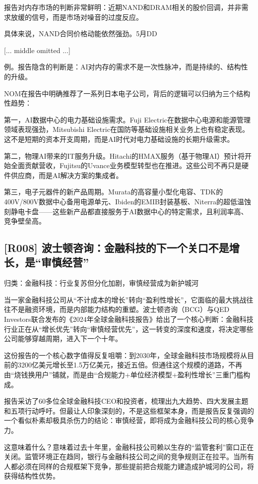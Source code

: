 \documentclass[11pt]{ctexart}
\begin{document}
报告对内存市场的判断非常鲜明：近期NAND和DRAM相关的股价回调，并非需求放缓的信号，而是市场对噪音的过度反应。

具体来说，NAND合同价格动能依然强劲。5月DD

[... middle omitted ...]

例。报告隐含的判断是：AI对内存的需求不是一次性脉冲，而是持续的、结构性的升级。

NOM在报告中明确推荐了一系列日本电子公司，背后的逻辑可以归纳为三个结构性趋势：

第一，AI数据中心的电力基础设施需求。Fuji Electric在数据中心电源和能源管理领域表现强劲，Mitsubishi Electric在国防等基础设施相关业务上也有稳定表现。这不是短期的资本开支周期，而是AI时代对电力基础设施的长期升级需求。

第二，物理AI带来的IT服务升级。Hitachi的HMAX服务（基于物理AI）预计将开始全面贡献营收，Fujitsu的Uvance业务模型转型也在推进。这些公司不再只是硬件供应商，而是AI解决方案的集成者。

第三，电子元器件的新产品周期。Murata的高容量小型化电容、TDK的400V/800V数据中心备用电源单元、Ibiden的EMIB封装基板、Niterra的超低温蚀刻静电卡盘——这些新产品都直接服务于AI数据中心的特定需求，且利润率高、竞争壁垒高。

\subsection{[R008] 波士顿咨询：金融科技的下一个关口不是增长，是“审慎经营”}
{\small\color{refgray}归类：金融科技：行业复苏但分化加剧，审慎经营成为新护城河}

当一家金融科技公司从“不计成本的增长”转向“盈利性增长”，它面临的最大挑战往往不是融资环境，而是内部能力结构的重塑。波士顿咨询（BCG）与QED Investors联合发布的《2024年全球金融科技报告》给出了一个核心判断：金融科技行业正在从“增长优先”转向“审慎经营优先”，这一转变的深度和速度，将决定哪些公司能够穿越周期，进入下一个十年。

这份报告的一个核心数字值得反复咀嚼：到2030年，全球金融科技市场规模将从目前的3200亿美元增长至1.5万亿美元，接近五倍。但通往这个规模的道路，不再由“烧钱换用户”铺就，而是由“合规能力+单位经济模型+盈利性增长”三重门槛构成。

报告采访了60多位全球金融科技CEO和投资者，梳理出九大趋势、四大发展主题和五项行动呼吁。但最让人印象深刻的，不是这些框架本身，而是报告反复强调的一个看似朴素却极具杀伤力的结论：审慎经营，即将成为金融科技公司的核心竞争力。

这意味着什么？意味着过去十年里，金融科技公司赖以生存的“监管套利”窗口正在关闭。监管环境正在趋同，银行与金融科技公司之间的竞争规则正在拉平。当所有人都必须在同样的合规框架下竞争，那些提前把合规能力建造成护城河的公司，将获得结构性优势。
\end{document}
